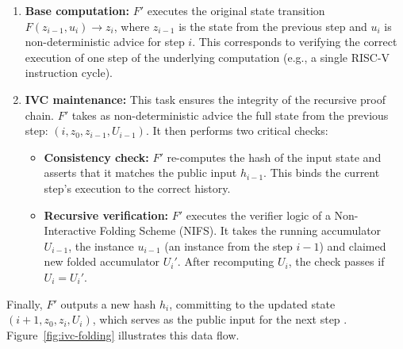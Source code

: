 \begin{enumerate}
	\item \textbf{Base computation:} $F'$ executes the original state transition
	      $F(z_{i-1}, u_i) \rightarrow z_i$, where $z_{i-1}$ is the state from the
	      previous step and $u_i$ is non-deterministic advice for step $i$. This
	      corresponds to verifying the correct execution of one step of the
	      underlying computation (e.g., a single RISC-V instruction cycle).

	\item \textbf{IVC maintenance:} This task ensures the integrity of the
	      recursive proof chain. $F'$ takes as non-deterministic advice the full state
	      from the previous step: $(i, z_0, z_{i-1}, U_{i-1})$. It then performs two
	      critical checks:
	      \begin{itemize}
		      \item \textbf{Consistency check:} $F'$ re-computes the hash of the
		            input state and asserts that it matches the public input $h_{i-1}$. This
		            binds the current step's execution to the correct history.
		      \item \textbf{Recursive verification:} $F'$ executes the verifier logic
		            of a Non-Interactive Folding Scheme (NIFS). It takes the running
		            accumulator $U_{i-1}$, the instance $u_{i-1}$ (an instance
		            from the step $i-1$) and claimed new folded accumulator $U_i'$.
		            After recomputing $U_i$, the check passes if $U_i = U_i'$.
	      \end{itemize}
\end{enumerate}

Finally, $F'$ outputs a new hash $h_i$, committing to the updated state $(i+1,
	z_0, z_i, U_i)$, which serves as the public input for the next step
\cite{Nova, SuperNova, HyperNova}. Figure~\ref{fig:ivc-folding} illustrates this data flow.

